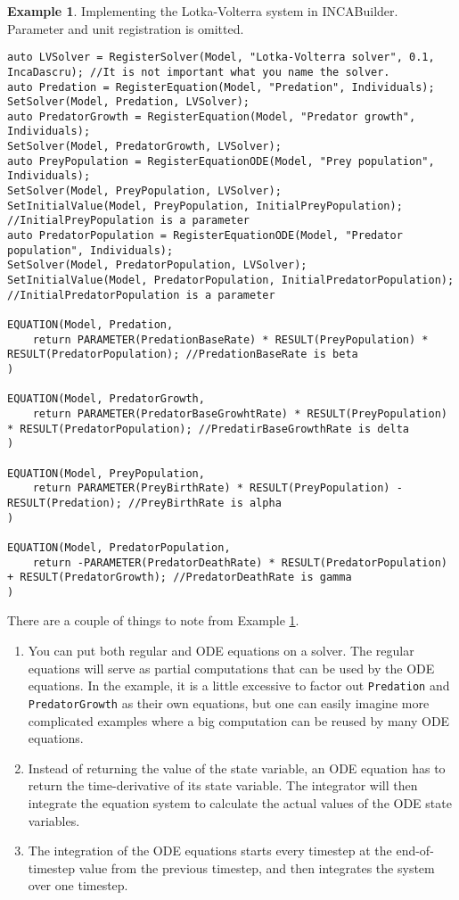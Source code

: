 \documentclass[11pt]{article}
\theoremstyle{definition}
\newtheorem{myexample}{Example}
\newenvironment{example}%
  {\begin{lrbox}{\examplebox}%
   \begin{minipage}{\dimexpr\linewidth-2\fboxsep}
   \begin{myexample}}%
  {\end{myexample}%
   \end{minipage}%
   \end{lrbox}%
   \begin{trivlist}
     \item[]\colorbox{silver}{\usebox\examplebox}
   \end{trivlist}}
\begin{document}
\begin{example}\label{ex:lotkavolterra}
Implementing the Lotka-Volterra system in INCABuilder. Parameter and unit registration is omitted.
\begin{lstlisting}[style=mycpp]
auto LVSolver = RegisterSolver(Model, "Lotka-Volterra solver", 0.1, IncaDascru); //It is not important what you name the solver.
auto Predation = RegisterEquation(Model, "Predation", Individuals);
SetSolver(Model, Predation, LVSolver);
auto PredatorGrowth = RegisterEquation(Model, "Predator growth", Individuals);
SetSolver(Model, PredatorGrowth, LVSolver);
auto PreyPopulation = RegisterEquationODE(Model, "Prey population", Individuals);
SetSolver(Model, PreyPopulation, LVSolver);
SetInitialValue(Model, PreyPopulation, InitialPreyPopulation); //InitialPreyPopulation is a parameter
auto PredatorPopulation = RegisterEquationODE(Model, "Predator population", Individuals);
SetSolver(Model, PredatorPopulation, LVSolver);
SetInitialValue(Model, PredatorPopulation, InitialPredatorPopulation); //InitialPredatorPopulation is a parameter

EQUATION(Model, Predation,
	return PARAMETER(PredationBaseRate) * RESULT(PreyPopulation) * RESULT(PredatorPopulation); //PredationBaseRate is beta
)

EQUATION(Model, PredatorGrowth,
	return PARAMETER(PredatorBaseGrowhtRate) * RESULT(PreyPopulation) * RESULT(PredatorPopulation); //PredatirBaseGrowthRate is delta
)

EQUATION(Model, PreyPopulation,
	return PARAMETER(PreyBirthRate) * RESULT(PreyPopulation) - RESULT(Predation); //PreyBirthRate is alpha
)

EQUATION(Model, PredatorPopulation,
	return -PARAMETER(PredatorDeathRate) * RESULT(PredatorPopulation) + RESULT(PredatorGrowth); //PredatorDeathRate is gamma
)
\end{lstlisting}
\end{example}

There are a couple of things to note from Example \ref{ex:lotkavolterra}.
\begin{enumerate}[i]
\item You can put both regular and ODE equations on a solver. The regular equations will serve as partial computations that can be used by the ODE equations. In the example, it is a little excessive to factor out {\tt Predation} and {\tt PredatorGrowth} as their own equations, but one can easily imagine more complicated examples where a big computation can be reused by many ODE equations.
\item Instead of returning the value of the state variable, an ODE equation has to return the time-derivative of its state variable. The integrator will then integrate the equation system to calculate the actual values of the ODE state variables.
\item The integration of the ODE equations starts every timestep at the end-of-timestep value from the previous timestep, and then integrates the system over one timestep.
\end{enumerate}
\end{document}
